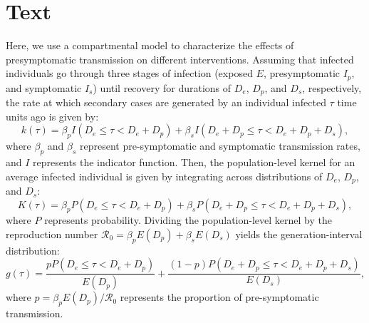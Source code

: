 \documentclass[12pt]{article}
\date{\today}
\newcommand{\Rx}[1]{\ensuremath{{\mathcal R}_{#1}}}
\newcommand{\Ro}{\Rx{0}}
\begin{document}


\section{Text}

Here, we use a compartmental model to characterize the effects of presymptomatic transmission on different interventions.
Assuming that infected individuals go through three stages of infection (exposed $E$, presymptomatic $I_p$, and symptomatic $I_s$) until recovery for durations of $D_e$, $D_p$, and $D_s$, respectively, the rate at which secondary cases are generated by an individual infected $\tau$ time units ago is given by:
\begin{equation}
k(\tau) = \beta_p I(D_e \leq \tau < D_e + D_p) + \beta_s I(D_e + D_p \leq \tau < D_e + D_p + D_s),
\end{equation}
where $\beta_p$ and $\beta_s$ represent pre-symptomatic and symptomatic transmission rates, and $I$ represents the indicator function.
Then, the population-level kernel for an average infected individual is given by integrating across distributions of $D_e$, $D_p$, and $D_s$:
\begin{equation}
K(\tau) = \beta_p P(D_e \leq \tau < D_e + D_p) + \beta_s P(D_e + D_p \leq \tau < D_e + D_p + D_s),
\end{equation}
where $P$ represents probability.
Dividing the population-level kernel by the reproduction number $\Ro = \beta_p E(D_p) + \beta_s E(D_s)$ yields the generation-interval distribution:
\begin{equation}
g(\tau) = \frac{p P(D_e \leq \tau < D_e + D_p)}{E(D_p)} + \frac{(1-p) P(D_e + D_p \leq \tau < D_e + D_p + D_s)}{E(D_s)},
\end{equation}
where $p = \beta_p E(D_p)/\Ro$ represents the proportion of pre-symptomatic transmission.
 
\end{document}
